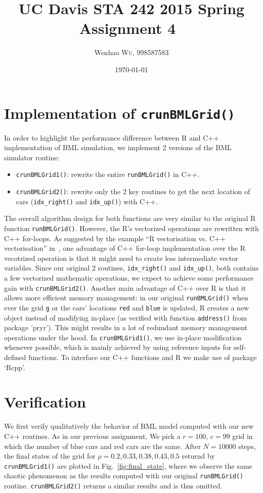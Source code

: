 \documentclass{article}
\title{UC Davis STA 242 2015 Spring Assignment 4~\cite{wu2015bmlgrid_v1.1}} %
\author{Wenhao \textsc{Wu}, 998587583} %
\date{\today} %
\begin{document}
\maketitle %


\section{Implementation of \texttt{crunBMLGrid()}}
In order to highlight the performance difference between R and C++
implementation of BML simulation, we implement 2 versions of the BML simulator
routine:
\begin{itemize}
    \item \texttt{crunBMLGrid1()}: rewrite the entire \texttt{runBMLGrid()} in
    C++.
    \item \texttt{crunBMLGrid2()}: rewrite only the 2 key routines to get the
    next location of cars (\texttt{idx\_right()} and \texttt{idx\_up()}) with
    C++.
\end{itemize}
The overall algorithm design for both functions are very similar to the original
R function \texttt{runBMLGrid()}. However, the R's vectorized operations are
rewritten with C++ for-loops. As suggested by the example ``R vectorisation vs.
C++ vectorisation'' in~\cite{wickham2014advanced}, one advantage of C++ for-loop
implementation over the R vecotrized operation is that it might need to create less
intermediate vector variables. Since our original 2 routines,
\texttt{idx\_right()} and \texttt{idx\_up()}, both contains a few vectorized
mathematic operations, we expect to achieve some performance gain with
\texttt{crunBMLGrid2()}. Another main advantage of C++ over R is that it allows
more efficient memory management: in our original \texttt{runBMLGrid()} when
ever the grid \texttt{g} or the cars' locations \texttt{red} and \texttt{blue}
is updated, R creates a new object instead of modifying in-place (as verified
with function \texttt{address()} from package 'pryr'). This might
results in a lot of redundant memory management operations under the hood. In
\texttt{crunBMLGrid1()}, we use in-place modification whenever possible, which
is mainly achieved by using reference inputs for self-defined functions. To
interface our C++ functions and R we make use of package `Rcpp'.

\section{Verification}
We first verify qualitatively the behavior of BML model computed with our new
C++ routines. As in our previous assignment, We pick a
$r=100$, $c=99$ grid in which the number of blue cars and red cars are the same. After $N =
10000$ steps, the final states of the grid for $\rho = 0.2, 0.33, 0.38, 0.43,
0.5$ returnd by \texttt{crunBMLGrid1()} are plotted in
Fig.~\ref{fig:final_state}, where we observe the same chaotic phenomenon as the
results computed with our original \texttt{runBMLGrid()} routine.
\texttt{crunBMLGrid2()} returns a similar results and is thus omitted.
\end{document}
